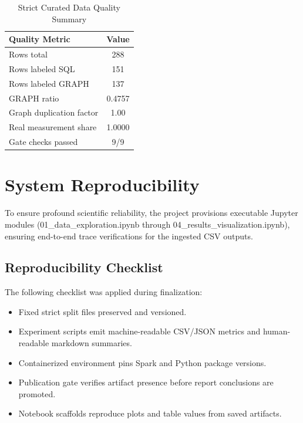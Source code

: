 \documentclass[conference]{IEEEtran}
\begin{document}
\begin{table}[h]
\centering
\caption{Strict Curated Data Quality Summary}
\label{tab:quality_summary}
\begin{tabular}{lc}
\toprule
Quality Metric & Value \\
\midrule
Rows total & 288 \\
Rows labeled SQL & 151 \\
Rows labeled GRAPH & 137 \\
GRAPH ratio & 0.4757 \\
Graph duplication factor & 1.00 \\
Real measurement share & 1.0000 \\
Gate checks passed & 9/9 \\
\bottomrule
\end{tabular}
\end{table}

\section{System Reproducibility}
To ensure profound scientific reliability, the project provisions executable Jupyter modules (01\_data\_exploration.ipynb through 04\_results\_visualization.ipynb), ensuring end-to-end trace verifications for the ingested CSV outputs.

\subsection{Reproducibility Checklist}
The following checklist was applied during finalization:
\begin{itemize}[leftmargin=*]
\item Fixed strict split files preserved and versioned.
\item Experiment scripts emit machine-readable CSV/JSON metrics and human-readable markdown summaries.
\item Containerized environment pins Spark and Python package versions.
\item Publication gate verifies artifact presence before report conclusions are promoted.
\item Notebook scaffolds reproduce plots and table values from saved artifacts.
\end{itemize}
\end{document}
